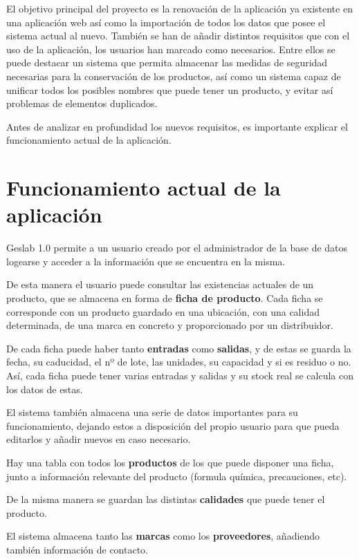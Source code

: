 
El objetivo principal del proyecto es la renovación de la aplicación ya existente en una aplicación web así como la importación de todos los datos que posee el sistema actual al nuevo. También se han de añadir distintos requisitos que con el uso de la aplicación, los usuarios han marcado como necesarios. Entre ellos se puede destacar un sistema que permita almacenar las medidas de seguridad necesarias para la conservación de los productos, así como un sistema capaz de unificar todos los posibles nombres que puede tener un producto, y evitar así problemas de elementos duplicados.

Antes de analizar en profundidad los nuevos requisitos, es importante explicar el funcionamiento actual de la aplicación.


\section{Funcionamiento actual de la aplicación}

Geslab 1.0 permite a un usuario creado por el administrador de la base de datos logearse y acceder a la información que se encuentra en la misma.

De esta manera el usuario puede consultar las existencias actuales de un producto, que se almacena en forma de \textbf{ficha de producto}. Cada ficha se corresponde con un producto guardado en una ubicación, con una calidad determinada, de una marca en concreto y proporcionado por un distribuidor.

De cada ficha puede haber tanto \textbf{entradas} como \textbf{salidas}, y de estas se guarda la fecha, su caducidad, el nº de lote, las unidades, su capacidad y si es residuo o no. Así, cada ficha puede tener varias entradas y salidas y su stock real se calcula con los datos de estas.

El sistema también almacena una serie de datos importantes para su funcionamiento, dejando estos a disposición del propio usuario para que pueda editarlos y añadir nuevos en caso necesario.   

Hay una tabla con todos los \textbf{productos} de los que puede disponer una ficha, junto a información relevante del producto (formula química, precauciones, etc).

De la misma manera se guardan las distintas \textbf{calidades} que puede tener el producto.

El sistema almacena tanto las \textbf{marcas} como los \textbf{proveedores}, añadiendo también información de contacto.

